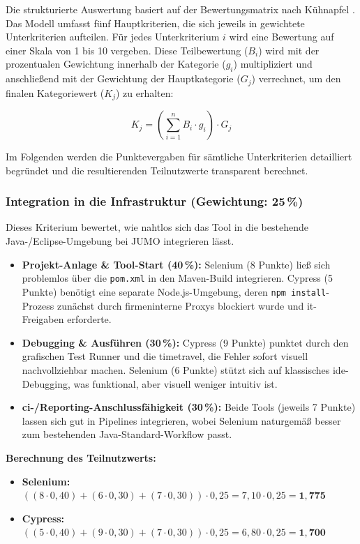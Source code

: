 Die strukturierte Auswertung basiert auf der Bewertungsmatrix nach Kühnapfel \cite{Kuehnapfel2021}. Das Modell umfasst fünf Hauptkriterien, die sich jeweils in gewichtete Unterkriterien aufteilen. Für jedes Unterkriterium $i$ wird eine Bewertung auf einer Skala von 1 bis 10 vergeben. Diese Teilbewertung ($B_i$) wird mit der prozentualen Gewichtung innerhalb der Kategorie ($g_i$) multipliziert und anschließend mit der Gewichtung der Hauptkategorie ($G_j$) verrechnet, um den finalen Kategoriewert ($K_j$) zu erhalten:

\begin{equation}
K_j = \left( \sum_{i=1}^{n} B_i \cdot g_i \right) \cdot G_j
\end{equation}

Im Folgenden werden die Punktevergaben für sämtliche Unterkriterien detailliert begründet und die resultierenden Teilnutzwerte transparent berechnet.

\subsubsection{Integration in die Infrastruktur (Gewichtung: 25\,\%)}
\label{sec:eval_integration}
Dieses Kriterium bewertet, wie nahtlos sich das Tool in die bestehende Java-/Eclipse-Umgebung bei JUMO integrieren lässt.
\begin{itemize}
    \item \textbf{Projekt-Anlage \& Tool-Start (40\,\%):} Selenium (8 Punkte) ließ sich problemlos über die \texttt{pom.xml} in den Maven-Build integrieren. Cypress (5 Punkte) benötigt eine separate Node.js-Umgebung, deren \texttt{npm install}-Prozess zunächst durch firmeninterne Proxys blockiert wurde und \gls{it}-Freigaben erforderte.
    \item \textbf{Debugging \& Ausführen (30\,\%):} Cypress (9 Punkte) punktet durch den grafischen Test Runner und die \gls{timetravel}, die Fehler sofort visuell nachvollziehbar machen. Selenium (6 Punkte) stützt sich auf klassisches \gls{ide}-Debugging, was funktional, aber visuell weniger intuitiv ist.
    \item \textbf{\gls{ci}-/Reporting-Anschlussfähigkeit (30\,\%):} Beide Tools (jeweils 7 Punkte) lassen sich gut in Pipelines integrieren, wobei Selenium naturgemäß besser zum bestehenden Java-Standard-Workflow passt.
\end{itemize}

\textbf{Berechnung des Teilnutzwerts:}
\begin{itemize}
    \item[] \textbf{Selenium:} $((8 \cdot 0{,}40) + (6 \cdot 0{,}30) + (7 \cdot 0{,}30)) \cdot 0{,}25 = 7{,}10 \cdot 0{,}25 = \mathbf{1{,}775}$
    \item[] \textbf{Cypress:} $((5 \cdot 0{,}40) + (9 \cdot 0{,}30) + (7 \cdot 0{,}30)) \cdot 0{,}25 = 6{,}80 \cdot 0{,}25 = \mathbf{1{,}700}$
\end{itemize}


